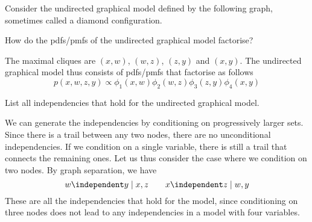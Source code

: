 \label{ex:factorisation-independencies-diamond}

Consider the undirected graphical model defined by the following graph, sometimes called a diamond configuration.

\begin{center}
\end{center}

\begin{exenumerate}

\item How do the pdfs/pmfs of the undirected graphical model factorise?

  \begin{solution}
    The maximal cliques are $(x, w)$, $(w, z)$, $(z, y)$ and $(x,
    y)$. The undirected graphical model thus consists of pdfs/pmfs
    that factorise as follows
    \begin{equation}
      p(x, w, z, y) \propto \phi_1(x,w) \phi_2(w,z) \phi_3(z,y) \phi_4(x,y)
    \end{equation}

  \end{solution}

\item List all independencies that hold for the undirected graphical model.

  \begin{solution}
    We can generate the independencies by conditioning on
    progressively larger sets. Since there is a trail between any two
    nodes, there are no unconditional independencies. If we condition
    on a single variable, there is still a trail that connects the
    remaining ones. Let us thus consider the case where we condition
    on two nodes. By graph separation, we have
    \begin{equation}
      w \independent y \mid x,z \quad \quad x \independent z \mid w,y
    \end{equation}
    These are all the independencies that hold for the model, since
    conditioning on three nodes does not lead to any independencies in
    a model with four variables.
  \end{solution}


\end{exenumerate}

